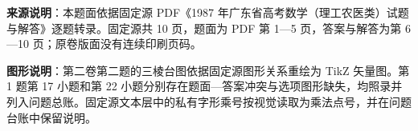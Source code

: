 


\begin{gktip}
\textbf{来源说明}：本题面依据固定源 PDF《1987 年广东省高考数学（理工农医类）试题与解答》逐题转录。固定源共 10 页，题面为 PDF 第 1—5 页，答案与解答为第 6—10 页；原卷版面没有连续印刷页码。

\textbf{图形说明}：第二卷第二题的三棱台图依据固定源图形关系重绘为 TikZ 矢量图。第 1 题第 17 小题和第 22 小题分别存在题面—答案冲突与选项图形缺失，均照录并列入问题总账。固定源文本层中的私有字形乘号按视觉读取为乘法点号，并在问题台账中保留说明。
\end{gktip}

